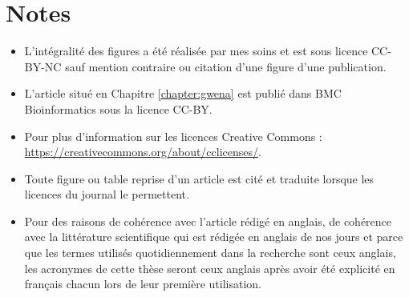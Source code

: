 \section{Notes}

\begin{itemize}
    \item L'intégralité des figures a été réalisée par mes soins et est sous licence CC-BY-NC sauf mention contraire ou citation d'une figure d'une publication.
    \item L'article situé en Chapitre \ref{chapter:gwena} est publié dans BMC Bioinformatics sous la licence CC-BY.
    \item Pour plus d'information sur les licences Creative Commons : \url{https://creativecommons.org/about/cclicenses/}.
    \item Toute figure ou table reprise d'un article est cité et traduite lorsque les licences du journal le permettent.
    \item Pour des raisons de cohérence avec l'article rédigé en anglais, de cohérence avec la littérature scientifique qui est rédigée en anglais de nos jours et parce que les termes utilisés quotidiennement dans la recherche sont ceux anglais, les acronymes de cette thèse seront ceux anglais après avoir été explicité en français chacun lors de leur première utilisation.
\end{itemize}